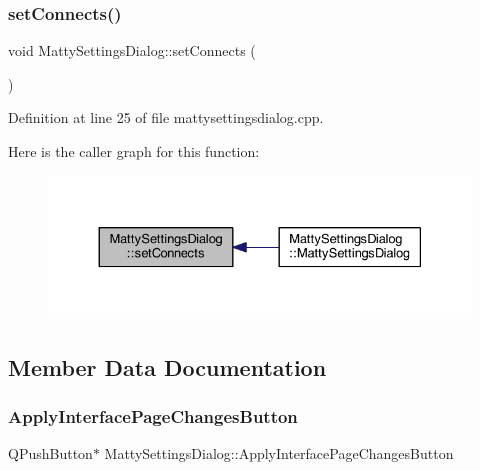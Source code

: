 \subsubsection{\texorpdfstring{set\+Connects()}{setConnects()}}
{\footnotesize\ttfamily void Matty\+Settings\+Dialog\+::set\+Connects (\begin{DoxyParamCaption}{ }\end{DoxyParamCaption})\hspace{0.3cm}{\ttfamily [private]}}



Definition at line 25 of file mattysettingsdialog.\+cpp.

Here is the caller graph for this function\+:
\nopagebreak
\begin{figure}[H]
\begin{center}
\leavevmode
\includegraphics[width=330pt]{classMattySettingsDialog_a4e0c6d5ea1b0a3a40a0f856386c21bce_icgraph}
\end{center}
\end{figure}


\subsection{Member Data Documentation}
\hypertarget{classMattySettingsDialog_aacdb8eada43f929ba854e06a6311f714}{}\label{classMattySettingsDialog_aacdb8eada43f929ba854e06a6311f714} 
\subsubsection{\texorpdfstring{Apply\+Interface\+Page\+Changes\+Button}{ApplyInterfacePageChangesButton}}
{\footnotesize\ttfamily Q\+Push\+Button$\ast$ Matty\+Settings\+Dialog\+::\+Apply\+Interface\+Page\+Changes\+Button\hspace{0.3cm}{\ttfamily [private]}}



